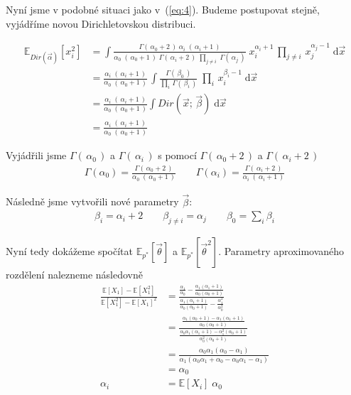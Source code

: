 Nyní jsme v podobné situaci jako v~(\ref{eq:4}). Budeme postupovat stejně,
vyjádříme novou Dirichletovskou distribuci.

\begin{align}
\mathbb{E}_{Dir(\vec\alpha)}[x_i^2] &=
\int \frac{\Gamma(\,\alpha_0 + 2\,) \; \alpha_i \; (\,\alpha_i + 1\,)}
		{\alpha_0 \; (\,\alpha_0 + 1\,) \; \Gamma(\,\alpha_i + 2\,) \; \prod_{j \ne i} \; \Gamma(\,\alpha_j\,)} \;
    x_i^{\alpha_i + 1} \, \prod_{j \ne i} \, x_j^{\alpha_j - 1} \;
\mathrm{d}\vec x
\\
&= \frac{\alpha_i \; (\,\alpha_i + 1\,)}
		{\alpha_0 \; (\,\alpha_0 + 1\,)} \,
	\int \frac{\Gamma(\,\beta_0\,)}
		{\prod_i \,\Gamma(\,\beta_i\,)} \;
        \prod_i \, x_i^{\beta_i - 1} \;
    \mathrm{d}\vec x
\\
&= \frac{\alpha_i \; (\,\alpha_i + 1\,)}
		{\alpha_0 \; (\,\alpha_0 + 1\,)}
	\int Dir(\vec x;\, \vec\beta)\;
    \mathrm{d}\vec x
\\
&= \frac{\alpha_i \; (\,\alpha_i + 1\,)}
		{\alpha_0 \; (\,\alpha_0 + 1\,)}
\end{align}

Vyjádřili jsme $\Gamma(\,\alpha_0\,)$ a $\Gamma(\,\alpha_i\,)$ s pomocí $\Gamma(\,\alpha_0 + 2\,)$ a $\Gamma(\,\alpha_i + 2\,)$
\begin{align}
\Gamma(\alpha_0) = \frac{\Gamma(\,\alpha_0 + 2\,)}
				{\alpha_0\;(\,\alpha_0 + 1\,)}
\quad \quad
\Gamma(\alpha_i) = \frac{\Gamma(\,\alpha_i + 2\,)}
				{\alpha_i \; (\,\alpha_i + 1\,)}
\end{align}

Následně jsme vytvořili nové parametry $\vec\beta$:
\begin{align}
\beta_i = \alpha_i + 2 \quad \quad
\beta_{j \ne i} = \alpha_j \quad \quad
\beta_0 = \sum_i \beta_i
\end{align}

Nyní tedy dokážeme spočítat $\mathbb{E}_{p^*}[\vec\theta]$ a $\mathbb{E}_{p^*}[\vec\theta^2]$.
Parametry aproximovaného rozdělení nalezneme následovně
\begin{align}
\frac{\mathbb{E}[X_1] - \mathbb{E}[X_1^2]}
     {\mathbb{E}[X_1^2] - \mathbb{E}[X_1]^2} &=
\frac{
	\frac{\alpha_1}
		{\alpha_0}
	- \frac{\alpha_1(\alpha_1 + 1)}
		{\alpha_0(\alpha_0 + 1)}
	}
	{
	\frac{\alpha_1(\alpha_1 + 1)}
		{\alpha_0(\alpha_0 + 1)}
	- \frac{\alpha_1^2}
		{\alpha_0^2}
	}
\label{eq:5}
\\
&=
\frac{
    \frac{\alpha_1 (\alpha_0 + 1) - \alpha_1(\alpha_1 + 1)}
         {\alpha_0 (\alpha_0 + 1)}
}{
    \frac{\alpha_0 \alpha_1 (\alpha_1 + 1) - \alpha_1^2 (\alpha_0 + 1)}
         {\alpha_0^2 (\alpha_0 + 1)}
}
\\
&=
\frac{\alpha_0 \alpha_1 (\alpha_0 - \alpha_1)}
     {\alpha_1 (\alpha_0 \alpha_1 + \alpha_0 - \alpha_0 \alpha_1 - \alpha_1)}
\\
&=
\alpha_0
\\
\alpha_i &= \mathbb{E}[X_i] \;\alpha_0 \label{eq:6}
\end{align}

